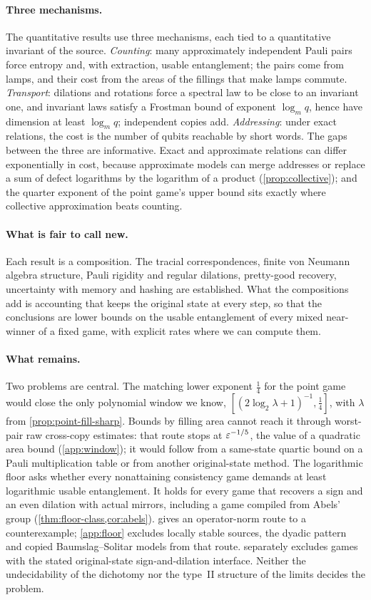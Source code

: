 \paragraph{Three mechanisms.} The quantitative results use three mechanisms, each tied to a quantitative invariant of the source. \emph{Counting}: many
approximately independent Pauli pairs force entropy and, with extraction, usable entanglement; the pairs come from lamps, and
their cost from the areas of the fillings that make lamps commute. \emph{Transport}: dilations and rotations force a spectral law
to be close to an invariant one, and invariant laws satisfy a Frostman bound of exponent $\log_mq$, hence have dimension at
least $\log_mq$; independent copies add. \emph{Addressing}: under
exact relations, the cost is the number of qubits reachable by short words. The gaps between the three are informative. Exact
and approximate relations can differ exponentially in cost, because approximate models can merge addresses or replace a sum of
defect logarithms by the logarithm of a product (\cref{prop:collective}); and the quarter exponent of the point game's upper bound
sits exactly where collective approximation beats counting.

\paragraph{What is fair to call new.} Each result is a composition. The tracial correspondences, finite von Neumann algebra
structure, Pauli rigidity and regular dilations, pretty-good recovery, uncertainty with memory and hashing are established. What
the compositions add is accounting that keeps the original state at every step, so that the conclusions are lower bounds on the
usable entanglement of every mixed near-winner of a fixed game, with explicit rates where we can compute them.

\paragraph{What remains.} Two problems are central. The matching lower exponent $\frac14$ for the point game would close the only
polynomial window we know, $[(2\log_2\lambda+1)^{-1},\frac14]$, with $\lambda$ from \cref{prop:point-fill-sharp}. Bounds by filling area cannot reach it through worst-pair raw cross-copy
estimates: that route stops at $\varepsilon^{-1/5}$, the value of a quadratic area bound (\cref{app:window}); it would follow from a
same-state quartic bound on a Pauli multiplication table or from another original-state method. The logarithmic floor asks whether
every nonattaining consistency game demands at least logarithmic usable entanglement. It holds for every game that recovers a sign
and an even dilation with actual mirrors, including a game compiled from Abels' group (\cref{thm:floor-class,cor:abels}).
 gives an operator-norm route to a counterexample; \cref{app:floor} excludes locally stable sources, the dyadic
pattern and copied Baumslag--Solitar models from that route.  separately excludes games with the stated
original-state sign-and-dilation interface. Neither the undecidability of the dichotomy nor the type~II structure of the limits
decides the problem.
